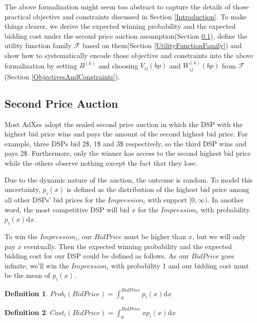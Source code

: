 \documentclass{article}
\newtheorem{definition}{Definition}[section]
\newcommand{\sV}{V_{ij}}
\newcommand{\sW}{W_{ij}^{(k)}}
\newcommand{\sB}{B^{(k)}}
\newcommand{\uff}{\mathscr{F}}
\begin{document}
The above formalization might seem too abstract to capture the details of
    those practical objective and constraints discussed in Section \ref{Introduction}.
To make things clearer, we
    derive the expected winning probability and the expected bidding cost
        under the second price auction assumption(Section \ref{SecondPriceAuction}),
    define the utility function family $\uff$ based on them(Section \ref{UtilityFunctionFamily})
    and show how to systematically encode those objective and constraints into the above formalization
        by setting $\sB$ and choosing $\sV(bp)$ and $\sW(bp)$ from $\uff$(Section \ref{ObjectivesAndConstraints}).

\subsection{Second Price Auction} \label{SecondPriceAuction}

Most AdXes adopt the sealed second price auction in which
    the DSP with the highest bid price wins and pays the amount of the second highest bid price.
For example, three DSPs bid 2\$, 1\$ and 3\$ respectively, so the third DSP wins and pays 2\$.
Furthermore, only the winner has access to the second highest bid price
    while the others observe nothing except the fact that they lose.

Due to the dynamic nature of the auction, the outcome is random.
To model this uncertainty, $p_i(x)$ is defined as the distribution of
    the highest bid price among all other DSPs' bid prices for the $Impression_i$ with support $[0, \infty)$.
In another word, the most competitive DSP will bid $x$ for the $Impression_i$ with probability $p_i(x) \mathrm{d} x$.

To win the $Impression_i$, our $BidPrice$ must be higher than $x$, but we will only pay $x$ eventually.
Then the expected winning probability and the expected bidding cost for our DSP could be defined as follows.
As our $BidPrice$ goes infinite, we'll win the $Impression_i$ with probability 1 and our bidding cost must be the mean of $p_i(x)$.

\begin{definition}
$Prob_i(BidPrice)= \int_0^{BidPrice} p_i(x) \mathrm{d} x$
\end{definition}

\begin{definition}
$Cost_i(BidPrice)= \int_0^{BidPrice} x p_i(x) \mathrm{d} x$
\end{definition}
\end{document}
